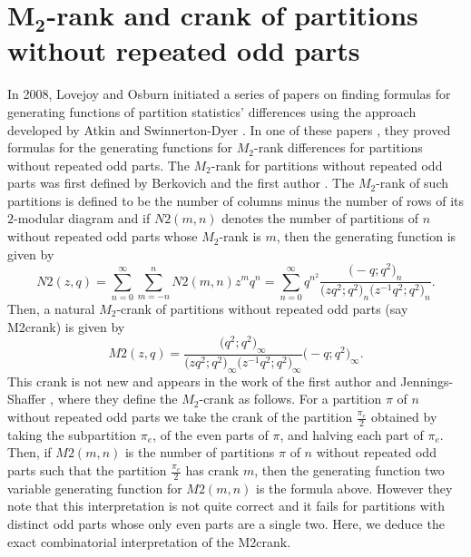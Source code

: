 \documentclass[pdftex]{sigma}
\numberwithin{equation}{section}
\begin{document}
\section[M\_2-rank and crank of partitions without repeated odd parts]{$\boldsymbol{M_2}$-rank and crank of partitions without repeated odd parts}\label{section4}

In 2008, Lovejoy and Osburn initiated a series of papers on finding formulas for generating functions of partition statistics' differences using the approach developed by Atkin and Swinnerton-Dyer \cite{At-Sw}. In one of these papers \cite{Lo-Os09}, they proved formulas for the generating functions for $M_2$-rank differences for partitions without repeated odd parts. The $M_2$-rank for partitions without repeated odd parts was first defined by Berkovich and the first author \cite{Be-Ga}. The $M_2$-rank of such partitions is defined to be the number of columns minus the number of rows of its $2$-modular diagram and if $N2(m, n)$ denotes the number of partitions of $n$ without repeated odd parts whose $M_2$-rank is $m$, then the generating function is given by \cite[equation~(1.1)]{Lo-Os09}
\begin{equation*}
N2(z,q) = \sum_{n=0}^\infty
\sum_{m=-n}^n N2(m,n) z^m q^n=\sum\limits_{n=0}^{\infty}q^{n^2}\dfrac{\bigl(-q;q^2\bigr)_{n}}{\bigl(zq^2;q^2\bigr)_{n}\bigl(z^{-1}q^2;q^2\bigr)_{n}}.
\end{equation*}
Then, a natural $M_2$-crank of partitions without repeated odd parts (say M2crank) is given by
\begin{equation*}
M2(z,q) = \dfrac{\bigl(q^2;q^2\bigr)_{\infty}}{\bigl(zq^2;q^2\bigr)_{\infty}\bigl(z^{-1}q^2;q^2\bigr)_{\infty}}\bigl(-q;q^2\bigr)_{\infty}.
\end{equation*}
This crank is not new and appears in the work of the first author and Jennings-Shaffer \cite{Ga-Sh}, where they define the $M_2$-crank as follows. For a partition $\pi$ of $n$ without repeated odd parts
we take the crank of the partition $\frac{\pi_e}{2}$ obtained
by taking the subpartition $\pi_e$, of the even parts of $\pi$,
and halving each part of $\pi_e$. Then, if $M2(m,n)$ is the number
of partitions $\pi$ of $n$ without repeated odd parts such that the
partition $\frac{\pi_e}{2}$ has crank $m$, then the generating
function two variable generating function for $M2(m,n)$ is the
formula above. However they note that this interpretation is not quite correct and it fails for partitions with distinct odd parts whose only even parts are a single two. Here, we deduce the exact combinatorial interpretation of the M2crank.
\end{document}
